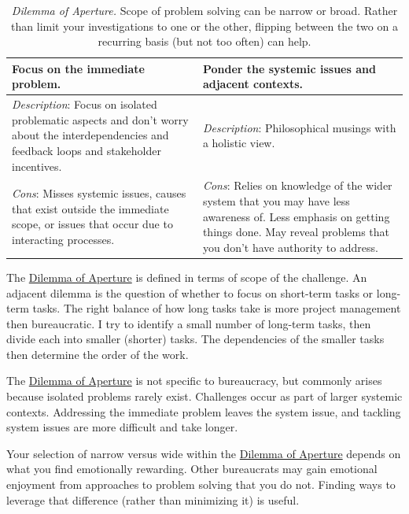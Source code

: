 \begin{center}
\begin{table}[H] %
\begin{tabular}{ | m{\dilemmatablewidth}| m{\dilemmatablewidth} | } 
  \hline
  \textbf{Focus on the immediate problem.} &
  \textbf{Ponder the systemic issues and adjacent contexts.} \\
  \hline
  \textit{Description}: Focus on isolated problematic aspects and don't worry about the interdependencies and feedback loops and stakeholder incentives. &
  \textit{Description}: Philosophical musings with a holistic view. \\
  \hline
  \textit{Cons}: Misses systemic issues, causes that exist outside the immediate scope, or issues that occur due to interacting processes. & 
  \textit{Cons}: Relies on knowledge of the wider system that you may have less awareness of. Less emphasis on getting things done. May reveal problems that you don't have authority to address. \\
  \hline
\end{tabular}
\caption{
\textit{Dilemma of Aperture.}
Scope of problem solving can be narrow or broad. Rather than limit your investigations to one or the other, flipping between the two on a recurring basis (but not too often) can help.
}
\label{table:focus-vs-systemic}
\end{table}
\end{center}

The \href{table:focus-vs-systemic}{Dilemma of Aperture} is defined in terms of scope of the challenge. An adjacent dilemma is the question of whether to focus on short-term tasks or long-term tasks. The right balance of how long tasks take is more project management then bureaucratic. I try to identify a small number of long-term tasks, then divide each into smaller (shorter) tasks. The dependencies of the smaller tasks then determine the order of the work.

The \href{table:focus-vs-systemic}{Dilemma of Aperture} is not specific to bureaucracy, but commonly arises because isolated problems rarely exist. Challenges occur as part of larger systemic contexts. Addressing the immediate problem leaves the system issue, and tackling system issues are more difficult and take longer. 

Your selection of narrow versus wide within the \href{table:focus-vs-systemic}{Dilemma of Aperture} depends on what you find emotionally rewarding. Other bureaucrats may gain emotional enjoyment from approaches to problem solving that you do not. Finding ways to leverage that difference (rather than minimizing it) is useful. 

